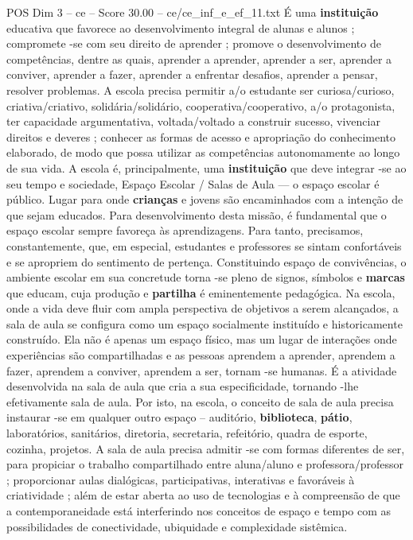 \begin{textsample}{POS Dim 3 – ce – Score 30.00 – ce/ce\_inf\_e\_ef\_11.txt}
É uma \textbf{instituição} educativa que favorece ao desenvolvimento integral de alunas e alunos ; compromete -se com seu direito de aprender ; promove o desenvolvimento de competências, dentre as quais, aprender a aprender, aprender a ser, aprender a conviver, aprender a fazer, aprender a enfrentar desafios, aprender a pensar, resolver problemas.
A escola precisa permitir a/o estudante ser curiosa/curioso, criativa/criativo, solidária/solidário, cooperativa/cooperativo, a/o protagonista, ter capacidade argumentativa, voltada/voltado a construir sucesso, vivenciar direitos e deveres ; conhecer as formas de acesso e apropriação do conhecimento elaborado, de modo que possa utilizar as competências autonomamente ao longo de sua vida.
A escola é, principalmente, uma \textbf{instituição} que deve integrar -se ao seu tempo e sociedade, Espaço Escolar / Salas de Aula — o espaço escolar é público.
Lugar para onde \textbf{crianças} e jovens são encaminhados com a intenção de que sejam educados.
Para desenvolvimento desta missão, é fundamental que o espaço escolar sempre favoreça às aprendizagens.
Para tanto, precisamos, constantemente, que, em especial, estudantes e professores se sintam confortáveis e se apropriem do sentimento de pertença.
Constituindo espaço de convivências, o ambiente escolar em sua concretude torna -se pleno de signos, símbolos e \textbf{marcas} que educam, cuja produção e \textbf{partilha} é eminentemente pedagógica.
Na escola, onde a vida deve fluir com ampla perspectiva de objetivos a serem alcançados, a sala de aula se configura como um espaço socialmente instituído e historicamente construído.
Ela não é apenas um espaço físico, mas um lugar de interações onde experiências são compartilhadas e as pessoas aprendem a aprender, aprendem a fazer, aprendem a conviver, aprendem a ser, tornam -se humanas.
É a atividade desenvolvida na sala de aula que cria a sua especificidade, tornando -lhe efetivamente sala de aula.
Por isto, na escola, o conceito de sala de aula precisa instaurar -se em qualquer outro espaço – auditório, \textbf{biblioteca}, \textbf{pátio}, laboratórios, sanitários, diretoria, secretaria, refeitório, quadra de esporte, cozinha, projetos.
A sala de aula precisa admitir -se com formas diferentes de ser, para propiciar o trabalho compartilhado entre aluna/aluno e professora/professor ; proporcionar aulas dialógicas, participativas, interativas e favoráveis à criatividade ; além de estar aberta ao uso de tecnologias e à compreensão de que a contemporaneidade está interferindo nos conceitos de espaço e tempo com as possibilidades de conectividade, ubiquidade e complexidade sistêmica.

\end{textsample}
